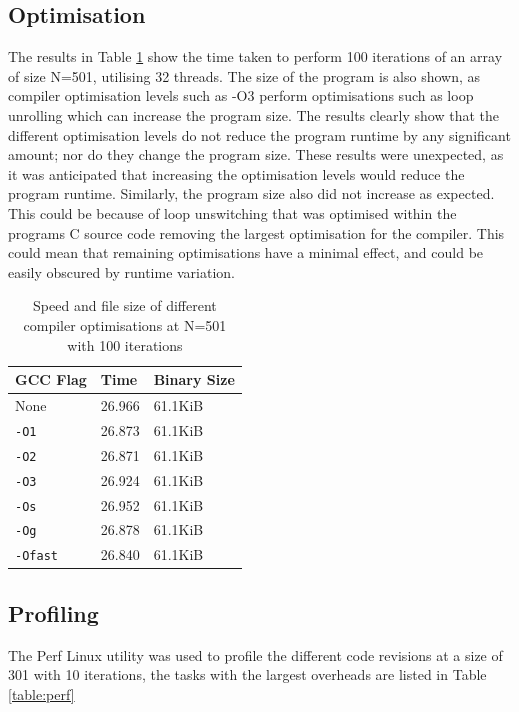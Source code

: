 \documentclass[12pt]{article}
\begin{document}
\subsection{Optimisation}
The results in Table \ref{table:opt} show the time taken to perform 100 iterations of an array of size N=501,
utilising 32 threads. The size of the program is also shown, as compiler optimisation levels such as -O3 perform
optimisations such as loop unrolling which can increase the program size. The results clearly show that the
different optimisation levels do not reduce the program runtime by any significant amount; nor do they change
the program size. These results were unexpected, as it was anticipated that increasing the optimisation levels
would reduce the program runtime. Similarly, the program size also did not increase as expected. This could be
because of loop unswitching that was optimised within the programs C source code removing the largest optimisation
for the compiler. This could mean that remaining optimisations have a minimal effect, and could be easily
obscured by runtime variation. 

\begin{table}[H]
    \centering
    \caption{Speed and file size of different compiler optimisations at N=501 with 100 iterations}
    \label{table:opt}
    \begin{tabular}{ | m{4cm} | m{3cm} | m{3cm} | }
        \hline
        \textbf{GCC Flag} & \textbf{Time} & \textbf{Binary Size}\\
        \hline
        None & 26.966 & 61.1KiB\\
        \hline
        \texttt{-O1} & 26.873 & 61.1KiB\\
        \hline
        \texttt{-O2} & 26.871 & 61.1KiB\\
        \hline
        \texttt{-O3} & 26.924 & 61.1KiB\\
        \hline
        \texttt{-Os} & 26.952 & 61.1KiB\\
        \hline
        \texttt{-Og} & 26.878 & 61.1KiB\\
        \hline
        \texttt{-Ofast} & 26.840 & 61.1KiB\\
        \hline
    \end{tabular}
\end{table}

\subsection{Profiling}
The Perf Linux utility was used to profile the different code revisions at a size of 301 with 10 iterations, the tasks with the largest overheads are
listed in Table \ref{table:perf}
\end{document}
